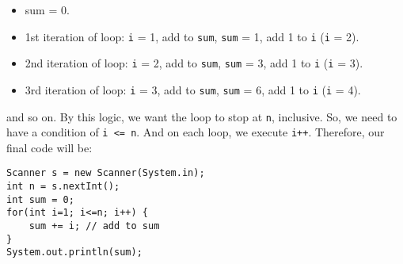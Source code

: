 \begin{itemize}
\item sum = 0.
\item 1st iteration of loop: \verb|i| = 1, add to \verb|sum|, \verb|sum| = 1, add 1 to \verb|i| (\verb|i| = 2).
\item 2nd iteration of loop: \verb|i| = 2, add to \verb|sum|, \verb|sum| = 3, add 1 to \verb|i| (\verb|i| = 3).
\item 3rd iteration of loop: \verb|i| = 3, add to \verb|sum|, \verb|sum| = 6, add 1 to \verb|i| (\verb|i| = 4).
\end{itemize}
and so on. By this logic, we want the loop to stop at \verb|n|, inclusive. So, we need to have a condition of \verb|i <= n|. And on each loop, we execute \verb|i++|. Therefore, our final code will be:
\begin{lstlisting}
Scanner s = new Scanner(System.in);
int n = s.nextInt();
int sum = 0;
for(int i=1; i<=n; i++) {
	sum += i; // add to sum
}
System.out.println(sum);
\end{lstlisting}

